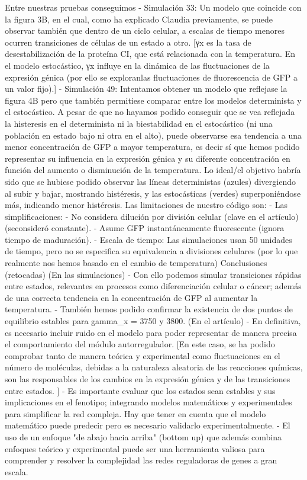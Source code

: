 Entre nuestras pruebas conseguimos
- Simulación 33: Un modelo que coincide con la figura 3B, en el cual, como ha explicado Claudia previamente, se puede observar también que dentro de un ciclo celular, a escalas de tiempo menores ocurren transiciones de células de un estado a otro.
    [γx es la tasa de desestabilización de la proteína CI, que está relacionada con la temperatura. En el modelo estocástico, γx influye en la dinámica de las fluctuaciones de la expresión génica (por ello se exploranlas fluctuaciones de  fluorescencia de GFP a un valor fijo).]
- Simulación 49: Intentamos obtener un modelo que reflejase la figura 4B pero que también permitiese comparar entre los modelos determinista y el estocástico. A pesar de que no hayamos podido conseguir que se vea reflejada la histeresis en el determinista ni la biestabilidad en el estocástico (ni una población en estado bajo ni otra en el alto), puede observarse esa tendencia a una menor concentración de GFP a mayor temperatura, es decir sí que hemos podido representar su influencia en la expresión génica y su diferente concentración en función del aumento o disminución de la temperatura. 
Lo ideal/el objetivo habría sido que se hubiese podido observar las líneas deterministas (azules) divergiendo al subir y bajar, mostrando histéresis, y las estocásticas (verdes) superponiéndose más, indicando menor histéresis. 
Las limitaciones de nuestro código son:
- Las simplificaciones: 
    - No considera dilución por división celular (clave en el artículo) (seconsideró constante). 
    - Asume GFP instantáneamente fluorescente (ignora tiempo de maduración). 
- Escala de tiempo: Las simulaciones usan 50 unidades de tiempo, pero no se especifica su equivalencia a divisiones celulares (por lo que realmente nos hemos basado en el cambio de temperatura)
Conclusiones (retocadas)
    (En las simulaciones)
    - Con ello podemos simular transiciones rápidas entre estados, relevantes en procesos como diferenciación celular o cáncer; además de una correcta tendencia en la concentración de GFP al aumentar la temperatura.
    - También hemos podido confirmar la existencia de dos puntos de equilibrio estables para gamma_x = 3750 y 3800.
    (En el artículo)
    - En definitiva, es necesario incluir ruido en el modelo para poder representar de manera precisa el comportamiento del módulo autorregulador. [En este caso, se ha podido comprobar tanto de manera teórica y experimental como fluctuaciones en el número de moléculas, debidas a la naturaleza aleatoria de las reacciones químicas, son las responsables de los cambios en la expresión génica y de las transiciones entre estados. ]
    - Es importante evaluar que los estados sean estables y sus implicaciones en el fenotipo; integrando modelos matemáticos y experimentales para simplificar la red compleja. Hay que tener en cuenta que el modelo matemático puede predecir pero es necesario validarlo experimentalmente.
    - El uso de un enfoque "de abajo hacia arriba" (bottom up) que además combina enfoques teórico y experimental puede ser una herramienta valiosa para comprender y resolver la complejidad las redes reguladoras de genes a gran escala.


